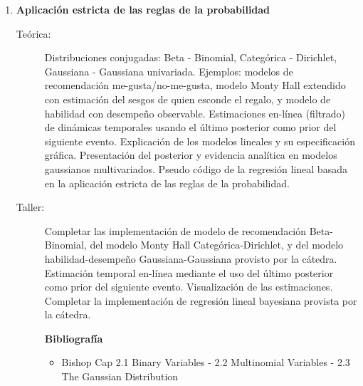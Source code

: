 \documentclass[10pt]{article}
\begin{document}
\begin{enumerate}
\item \textbf{Aplicación estricta de las reglas de la probabilidad}
\vspace{-0.15cm}
\begin{description}
\item[Teórica:] Distribuciones conjugadas: Beta - Binomial, Categórica - Dirichlet, Gaussiana - Gaussiana univariada.
Ejemplos: modelos de recomendación me-gusta/no-me-gusta, modelo Monty Hall extendido con estimación del sesgos de quien esconde el regalo, y modelo de habilidad con desempeño observable.
Estimaciones en-línea (filtrado) de dinámicas temporales usando el último posterior como prior del siguiente evento.
Explicación de los modelos lineales y su especificación gráfica.
Presentación del posterior y evidencia analítica en modelos gaussianos multivariados.
Pseudo código de la regresión lineal basada en la aplicación estricta de las reglas de la probabilidad.
\item[Taller:] Completar las implementación de modelo de recomendación Beta-Binomial, del modelo Monty Hall Categórica-Dirichlet, y del modelo habilidad-desempeño Gaussiana-Gaussiana provisto por la cátedra.
Estimación temporal en-línea mediante el uso del último posterior como prior del siguiente evento.
Visualización de las estimaciones.
Completar la implementación de regresión lineal bayesiana provista por la cátedra.
\item[] \textbf{Bibliografía}
\begin{itemize}
\item Bishop \cite{bishop2006-PRML} Cap 2.1 Binary Variables - 2.2 Multinomial Variables - 2.3 The Gaussian Distribution
\end{itemize}
\end{description}



\end{enumerate}
\end{document}
